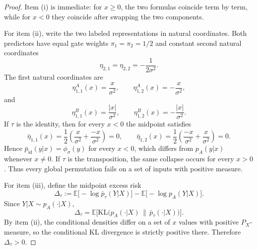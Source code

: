 \documentclass[11pt]{article}
\theoremstyle{definition}
\newcommand{\E}{\mathbb{E}}
\begin{document}
\begin{proof}
Item (i) is immediate: for $x\ge 0$, the two formulas coincide term by term,
while for $x<0$ they coincide after swapping the two components.

For item (ii), write the two labeled representations in natural coordinates.
Both predictors have equal gate weights $\pi_1=\pi_2=1/2$ and constant second
natural coordinates
\[
  \eta_{2,1}=\eta_{2,2}=-\frac{1}{2\sigma^2}.
\]
The first natural coordinates are
\[
  \eta_{1,1}^A(x)=\frac{x}{\sigma^2},
  \qquad
  \eta_{1,2}^A(x)=-\frac{x}{\sigma^2},
\]
and
\[
  \eta_{1,1}^B(x)=\frac{|x|}{\sigma^2},
  \qquad
  \eta_{1,2}^B(x)=-\frac{|x|}{\sigma^2}.
\]
If $\tau$ is the identity, then for every $x<0$ the midpoint satisfies
\[
  \bar\eta_{1,1}(x)
  =
  \frac{1}{2}\left(\frac{x}{\sigma^2}+\frac{-x}{\sigma^2}\right)=0,
  \qquad
  \bar\eta_{1,2}(x)
  =
  \frac{1}{2}\left(\frac{-x}{\sigma^2}+\frac{x}{\sigma^2}\right)=0.
\]
Hence $\bar p_{\mathrm{id}}(y|x)=\phi_\sigma(y)$ for every $x<0$, which differs
from $p_A(y|x)$ whenever $x\ne 0$. If $\tau$ is the transposition, the same
collapse occurs for every $x>0$. Thus every global permutation fails on a set
of inputs with positive measure.

For item (iii), define the midpoint excess risk
\[
  \Delta_\tau
  :=
  \E\big[-\log \bar p_\tau(Y|X)\big]
  -
  \E\big[-\log p_A(Y|X)\big].
\]
Since $Y|X\sim p_A(\cdot|X)$,
\[
  \Delta_\tau
  =
  \E\Big[
    \mathrm{KL}\big(p_A(\cdot|X)\,\|\,\bar p_\tau(\cdot|X)\big)
  \Big].
\]
By item (ii), the conditional densities differ on a set of $x$ values with
positive $P_X$-measure, so the conditional KL divergence is strictly positive
there. Therefore $\Delta_\tau>0$.
\end{proof}
\end{document}
